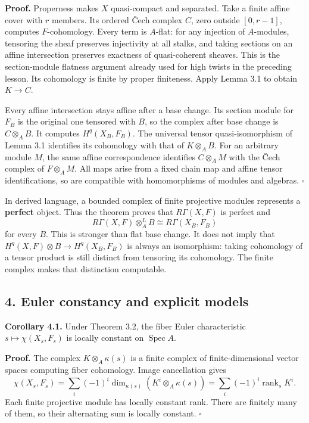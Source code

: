 \documentclass[11pt]{article}
\begin{document}
\textbf{Proof.} Properness makes \(X\) quasi-compact and separated. Take
a finite affine cover with \(r\) members. Its ordered Čech complex
\(C\), zero outside \([0,r-1]\), computes \(F\)-cohomology. Every term
is \(A\)-flat: for any injection of \(A\)-modules, tensoring the sheaf
preserves injectivity at all stalks, and taking sections on an affine
intersection preserves exactness of quasi-coherent sheaves. This is the
section-module flatness argument already used for high twists in the
preceding lesson. Its cohomology is finite by proper finiteness. Apply
Lemma 3.1 to obtain \(K\to C\).

Every affine intersection stays affine after a base change. Its section
module for \(F_B\) is the original one tensored with \(B\), so the
complex after base change is \(C\otimes_A B\). It computes
\(H^q(X_B,F_B)\). The universal tensor quasi-isomorphism of Lemma 3.1
identifies its cohomology with that of \(K\otimes_A B\). For an
arbitrary module \(M\), the same affine correspondence identifies
\(C\otimes_A M\) with the Čech complex of \(F\otimes_A M\). All maps
arise from a fixed chain map and affine tensor identifications, so are
compatible with homomorphisms of modules and algebras. \(\square\)

In derived language, a bounded complex of finite projective modules
represents a \textbf{perfect} object. Thus the theorem proves that
\(R\Gamma(X,F)\) is perfect and \[
R\Gamma(X,F)\otimes_A^L B\cong R\Gamma(X_B,F_B)
\] for every \(B\). This is stronger than flat base change. It does not
imply that \(H^q(X,F)\otimes B\to H^q(X_B,F_B)\) is always an
isomorphism: taking cohomology of a tensor product is still distinct
from tensoring its cohomology. The finite complex makes that distinction
computable.

\subsection{4. Euler constancy and explicit
models}\label{euler-constancy-and-explicit-models}

\textbf{Corollary 4.1.} Under Theorem 3.2, the fiber Euler
characteristic \(s\mapsto\chi(X_s,F_s)\) is locally constant on
\(\operatorname{Spec}A\).

\textbf{Proof.} The complex \(K\otimes_A\kappa(s)\) is a finite complex
of finite-dimensional vector spaces computing fiber cohomology. Image
cancellation gives \[
\chi(X_s,F_s)=\sum_i(-1)^i\dim_{\kappa(s)}(K^i\otimes_A\kappa(s))
=\sum_i(-1)^i\operatorname{rank}_s K^i.
\] Each finite projective module has locally constant rank. There are
finitely many of them, so their alternating sum is locally constant.
\(\square\)
\end{document}
